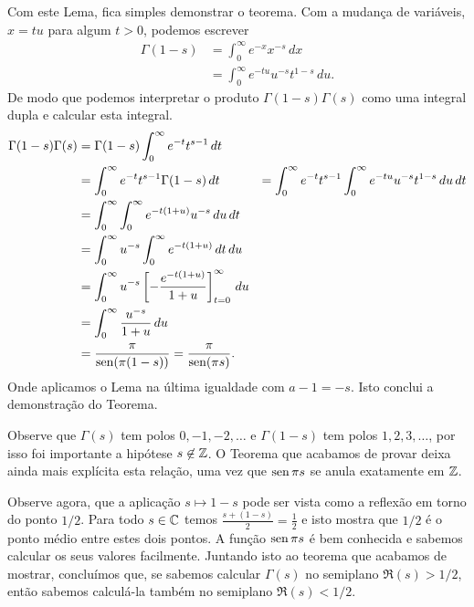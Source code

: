     Com este Lema, fica simples demonstrar o teorema. Com a mudança de variáveis, $x = tu$ para algum $t>0$, podemos escrever
    \begin{align*}
        \Gamma(1-s) &= \int_{0}^{\infty}e^{-x}x^{-s}\, dx \\
        &= \int_{0}^{\infty}e^{-tu}u^{-s}t^{1-s}\, du.
    \end{align*}
    De modo que podemos interpretar o produto $\Gamma(1-s)\Gamma(s)$ como uma integral dupla e calcular esta integral.
    \begin{align*}
        \Gamma(1-s)\Gamma(s) &= \Gamma(1-s)\int_{0}^{\infty}e^{-t}t^{s-1}\, dt \\
        &= \int_{0}^{\infty}e^{-t}t^{s-1}\Gamma(1-s)\, dt
        &= \int_{0}^{\infty}e^{-t}t^{s-1}\int_{0}^{\infty}e^{-tu}u^{-s}t^{1-s}\, du \, dt \\
        &= \int_{0}^{\infty}\int_{0}^{\infty}e^{-t(1+u)}u^{-s}\, du \, dt \\
        &= \int_{0}^{\infty} u^{-s}\int_{0}^{\infty}e^{-t(1+u)}\, dt \, du \\
        &= \int_{0}^{\infty} u^{-s} \left [-\frac{e^{-t(1+u)}}{1+u} \right]_{t=0}^{\infty} \, du \\
        &= \int_{0}^{\infty} \frac{u^{-s}}{1+u}  \, du \\
        &= \frac{\pi}{\operatorname{sen}(\pi(1-s))} = \frac{\pi}{\operatorname{sen}(\pi s)}.
    \end{align*}
    Onde aplicamos o Lema na última igualdade com $a - 1 = -s$. Isto conclui a demonstração do Teorema.
    
    Observe que $\Gamma(s)$ tem polos $0,-1,-2, \dots $ e $\Gamma(1-s)$ tem polos $1, 2, 3, \dots$, por isso foi importante a hipótese $s \not \in \mathbb{Z}$. O Teorema que acabamos de provar deixa ainda mais explícita esta relação, uma vez que $\operatorname{sen} \pi s$ se anula exatamente em $\mathbb{Z}$. 
    
    Observe agora, que a aplicação $s \mapsto 1-s$ pode ser vista como a reflexão em torno do ponto $1/2$. Para todo $s \in \mathbb{C}$ temos $\frac{s + (1-s)}{2} = \frac{1}{2}$ e isto mostra que $1/2$ é o ponto médio entre estes dois pontos. A função $\operatorname{sen} \pi s$ é bem conhecida e sabemos calcular os seus valores facilmente. Juntando isto ao teorema que acabamos de mostrar, concluímos que, se sabemos calcular $\Gamma(s)$ no semiplano $\Re(s) > 1/2$, então sabemos calculá-la também no semiplano $\Re(s) < 1/2$.
    
